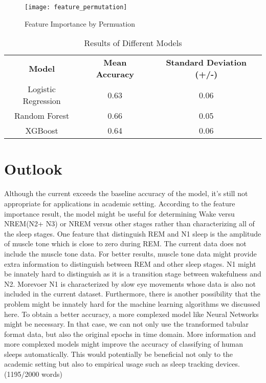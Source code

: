 \begin{figure}[ht]
  \texttt{[image: feature\_permutation]}
  \caption{Feature Importance by Permuation}
  \label{fig:permutation}
\end{figure} 

\begin{table}[ht]
\centering
\caption{Results of Different Models} 
\begin{tabular}{ c c c }
 \textbf{Model} & \textbf{Mean Accuracy} & \textbf{Standard Deviation (+/-)} \\ 
 Logistic Regression & 0.63 & 0.06 \\  
 Random Forest & 0.66 & 0.05\\
 XGBoost & 0.64 & 0.06
\end{tabular}
\label{tab:result} 
\end{table}

\section*{Outlook}
Although the current exceeds the baseline accuracy of the model, it's still not appropriate for applications in academic setting. According to the feature importance result, the model might be useful for determining Wake versu NREM(N2+ N3) or NREM versus other stages rather than characterizing all of the sleep stages. One feature that distinguish REM and N1 sleep is the amplitude of muscle tone which is close to zero during REM. The current data does not include the muscle tone data. For better results, muscle tone data might provide extra information to distinguish between REM and other sleep stages. N1 might be innately hard to distinguish as it is a transition stage between wakefulness and N2. Morevoer N1 is characterized by slow eye movements whose data is also not included in the current dataset. Furthermore, there is another possibility that the problem might be innately hard for the machine learning algorithms we discussed here. To obtain a better accuracy, a more complexed model like Neural Networks might be necessary. In that case, we can not only use the transformed tabular format data, but also the original epochs in time domain. More information and more complexed models might improve the accuracy of classifying of human sleeps automatically. This would potentially be beneficial not only to the academic setting but also to empirical usage such as sleep tracking devices. (1195/2000 words)
\\

